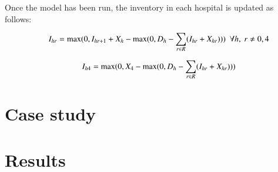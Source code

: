 \documentclass{paper}
\begin{document}
Once the model has been run, the inventory in each hospital is updated as follows:

	\begin{equation}
	\begin{array}{ll@{}ll}
	& \displaystyle I_{hr} = \max(0, I_{hr+1} + X_{h} - \max(0,D_{h}- \sum\limits_{r \in R}(I_{hr} + X_{hr}))) \ \ \forall h, \ r \neq 0 , 4 \\
	\end{array}
	\label{eq:Eq32}
	\end{equation}	

	
	\begin{equation}
	\begin{array}{ll@{}ll}
	& \displaystyle I_{h4} = \max(0, X_{4} - \max(0,D_{h}- \sum\limits_{r \in R}(I_{hr} + X_{hr})))\\
	\end{array}
	\label{eq:Eq32}
	\end{equation}	

\section{Case study}

\section{Results}


\end{document}
